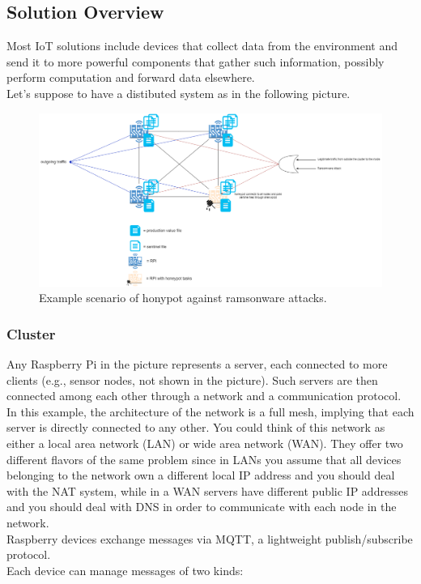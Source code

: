 \subsection{Solution Overview}

Most IoT solutions include devices that collect data from the environment and send it to more powerful components that gather such information, possibly perform computation and forward data elsewhere.\\
Let's suppose to have a distibuted system as in the following picture.


\begin{figure}[h!]
  \centering
  \includegraphics[width = 16cm]{images/ramsonwareHoneypot.png}
  \caption{ Example scenario of honypot against ramsonware attacks.}
  \label{fig:irradiances}
\end{figure}
\FloatBarrier

\subsubsection{Cluster}

\noindent Any Raspberry Pi in the picture represents a server, each connected to more clients (e.g., sensor nodes, not shown in the picture). Such servers are then connected among each other through a network and a communication protocol.\\
In this example, the architecture of the network is a full mesh, implying that each server is directly connected to any other. You could think of this network as either a local area network (LAN) or wide area network (WAN). They offer two different flavors of the same problem since in LANs you assume that all devices belonging to the network own a different local IP address and you should deal with the NAT system, while in a WAN servers have different public IP addresses and you should deal with DNS in order to communicate with each node in the network. \\ 
Raspberry devices exchange messages via MQTT, a lightweight publish/subscribe protocol. \\
Each device can manage messages of two kinds:

